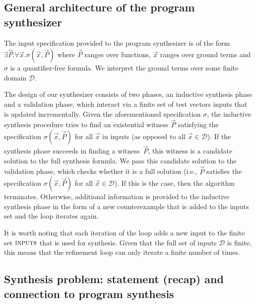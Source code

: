 \documentclass[runningheads,a4paper]{llncs}
\begin{document}
\subsection{General architecture of the program synthesizer}
\label{synthesizer-general}
The input specification provided to the program synthesizer is of the form
$\exists \vec{P} .  \forall \vec{x}.  \sigma(\vec{x}, \vec{P})$ where
$\vec{P}$ ranges over functions, $\vec{x}$ 
 ranges over ground terms and
$\sigma$ is a quantifier-free formula.  We interpret the ground terms over
some finite domain $\mathcal{D}$.

The design of our synthesizer consists of two phases, an inductive
synthesis phase and a validation phase, which interact via a finite
set of test vectors {\sc inputs} that is updated incrementally.  Given
the aforementioned specification $\sigma$, the inductive synthesis
procedure tries to find an existential witness $\vec{P}$ satisfying
the specification $\sigma(\vec{x}, \vec{P})$ for all $\vec{x}$ in {\sc
  inputs} (as opposed to all $\vec{x} \in \mathcal{D}$).
%
If the synthesis phase succeeds in finding a witness~$\vec{P}$, this
witness is a candidate solution to the full synthesis formula.  We
pass this candidate solution to the validation phase, which checks
whether it is a full solution (i.e., $\vec{P}$ satisfies the
specification $\sigma(\vec{x}, \vec{P})$ for all
$\vec{x}\in\mathcal{D}$).  If this is the case, then the algorithm
terminates.  Otherwise, additional information is provided to the
inductive synthesis phase in the form of a new counterexample that is
added to the {\sc inputs} set and the loop iterates again.

It is worth noting that each iteration of the loop adds a new input to
the finite set $\text{\sc inputs}$ that is used for synthesis.  Given
that the full set of inputs $\mathcal{D}$ is finite, this means that
the refinement loop can only iterate a finite number of times.

\subsection{Synthesis problem: statement (recap) and connection to program synthesis}
\end{document}
